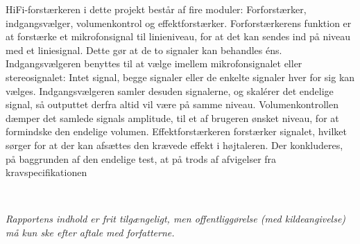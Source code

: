 \begin{multicols}{2}
{\begin{minipage}{2.8in}
HiFi-forstærkeren i dette projekt består af fire moduler: Forforstærker, indgangsvælger, volumenkontrol og effektforstærker. Forforstærkerens funktion er at forstærke et mikrofonsignal til linieniveau, for at det kan sendes ind på niveau med et liniesignal. Dette gør at de to signaler kan behandles éns.
Indgangsvælgeren benyttes til at vælge imellem mikrofonsignalet eller stereosignalet: Intet signal, begge signaler eller de enkelte signaler hver for sig kan vælges. Indgangsvælgeren samler desuden signalerne, og skalérer det endelige signal, så outputtet derfra altid vil være på samme niveau.
Volumenkontrollen dæmper det samlede signals amplitude, til et af brugeren ønsket niveau, for at formindske den endelige volumen.
Effektforstærkeren forstærker signalet, hvilket sørger for at der kan afsættes den krævede effekt i højtaleren.
Der konkluderes, på baggrunden af den endelige test, at på trods af afvigelser fra kravspecifikationen 
\end{minipage}}
\newline
~
\newline
~
\newline
~
\newline
~
\end{multicols}

\textit{\scriptsize{Rapportens indhold er frit tilgængeligt, men offentliggørelse (med kildeangivelse) må kun ske efter aftale med forfatterne.}}
